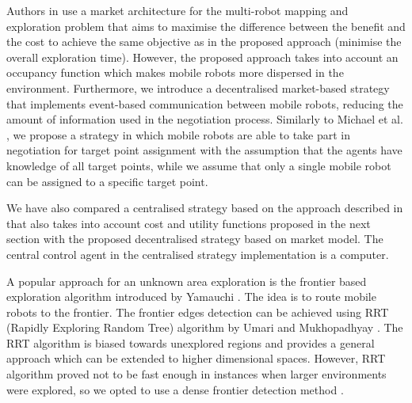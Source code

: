 Authors in \cite{Zlot2002} use a market architecture for the multi-robot mapping and exploration problem that aims to maximise the difference between the benefit and the cost to achieve the same objective as in the proposed approach (minimise the overall exploration time). However, the proposed approach takes into account an occupancy function which makes mobile robots more dispersed in the environment. Furthermore, we introduce a decentralised market-based strategy that implements event-based communication between mobile robots, reducing the amount of information used in the negotiation process. Similarly to Michael et al. \cite{Michael2008}, we propose a strategy in which mobile robots are able to take part in negotiation for target point assignment with the assumption that the agents have knowledge of all target points, while we assume that only a single mobile robot can be assigned to a specific target point.  

We have also compared a centralised strategy based on the approach described in \cite{Burgard2005} that also takes into account cost and utility functions proposed in the next section with the proposed decentralised strategy based on market model. The central control agent in the centralised strategy implementation is a computer.

A popular approach for an unknown area exploration is the frontier based exploration algorithm introduced by Yamauchi \cite{Yamauchi1998}. The idea is to route mobile robots to the frontier. The frontier edges detection can be achieved using RRT (Rapidly Exploring Random Tree) algorithm by Umari and Mukhopadhyay \cite{Umari2017}. The RRT algorithm is biased towards unexplored regions and provides a general approach which can be extended to higher dimensional spaces. However, RRT algorithm proved not to be fast enough in instances when larger environments were explored, so we opted to use a dense frontier detection method \cite{Orsulic2019}.